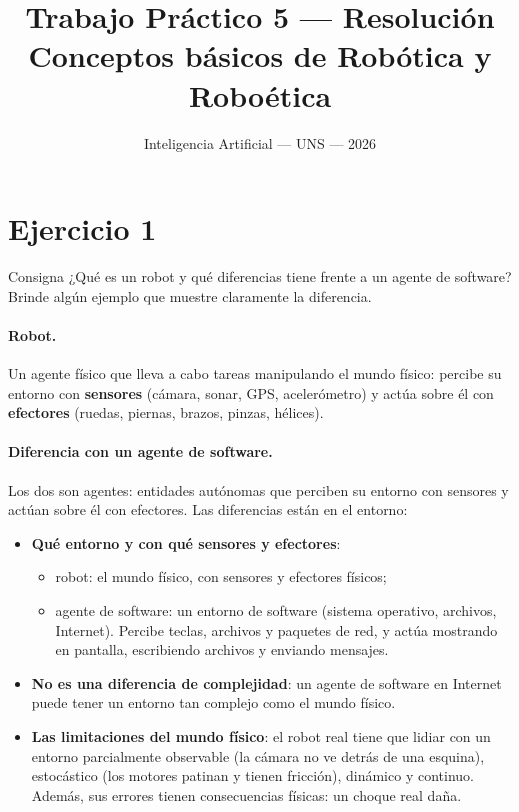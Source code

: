 \documentclass[11pt,a4paper]{article}
\title{\vspace{-1.5cm}\textbf{Trabajo Práctico 5 --- Resolución}\\[3pt]
\large Conceptos básicos de Robótica y Roboética}
\author{\normalsize Inteligencia Artificial --- UNS --- 2026}
\date{}
\begin{document}
\maketitle
\vspace{-1cm}
\notafuentes

\indice

\section{Ejercicio 1}

\begin{enunciado}{Consigna}
¿Qué es un robot y qué diferencias tiene frente a un agente de software? Brinde algún ejemplo que muestre claramente la diferencia.
\end{enunciado}

\paragraph{Robot.} Un agente físico que lleva a cabo tareas manipulando el mundo físico: percibe su entorno con \textbf{sensores} (cámara, sonar, GPS, acelerómetro) y actúa sobre él con \textbf{efectores} (ruedas, piernas, brazos, pinzas, hélices).

\paragraph{Diferencia con un agente de software.} Los dos son agentes: entidades autónomas que perciben su entorno con sensores y actúan sobre él con efectores. Las diferencias están en el entorno:
\begin{itemize}
  \item \textbf{Qué entorno y con qué sensores y efectores}:
  \begin{itemize}
    \item robot: el mundo físico, con sensores y efectores físicos;
    \item agente de software: un entorno de software (sistema operativo, archivos, Internet). Percibe teclas, archivos y paquetes de red, y actúa mostrando en pantalla, escribiendo archivos y enviando mensajes.
  \end{itemize}
  \item \textbf{No es una diferencia de complejidad}: un agente de software en Internet puede tener un entorno tan complejo como el mundo físico.
  \item \textbf{Las limitaciones del mundo físico}: el robot real tiene que lidiar con un entorno parcialmente observable (la cámara no ve detrás de una esquina), estocástico (los motores patinan y tienen fricción), dinámico y continuo. Además, sus errores tienen consecuencias físicas: un choque real daña.
\end{itemize}
\end{document}
